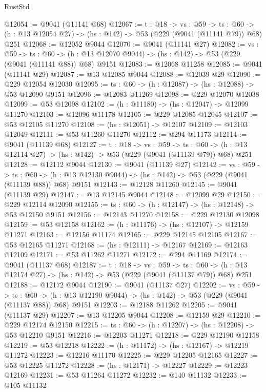 \begin{lexlean}{RustStd}
\begin{coremodule}
@12054 := @9041 (@11141 @68)
@12067 := {t : @18} ->
  {vs : @59} ->
  {ts : @60} -> (h : @13 @12054 @27) -> (hs : @142) -> @53 (@229 (@9041 (@11141 @79)) @68) @251
@12068 := @12052 @9044
@12070 := @9041 (@11141 @27)
@12082 := {vs : @59} ->
  {ts : @60} -> (h : @13 @12070 @9044) -> (hs : @142) -> @53 (@229 (@9041 (@11141 @88)) @68) @9151
@12083 := @12068 @11258
@12085 := @9041 (@11141 @29)
@12087 := @13 @12085 @9044
@12088 := @12039 @29
@12090 := @229 @12054 @12030
@12095 := {ts : @60} -> (h : @12087) -> (hs : @12088) -> @53 @12090 @9151
@12096 := @12083 @11269
@12098 := @229 @12070 @12038
@12099 := @53 @12098
@12102 := (h : @11180) -> (hs : @12047) -> @12099 @11270
@12103 := @12096 @11178
@12105 := @229 @12085 @12045
@12107 := @53 @12105 @11270
@12108 := (hs : @12051) -> @12107
@12109 := @12103 @12049
@12111 := @53 @11260 @11270
@12112 := @294 @11173
@12114 := @9041 (@11139 @68)
@12127 := {t : @18} ->
  {vs : @59} ->
  {ts : @60} -> (h : @13 @12114 @27) -> (hs : @142) -> @53 (@229 (@9041 (@11139 @79)) @68) @251
@12128 := @12112 @9044
@12130 := @9041 (@11139 @27)
@12142 := {vs : @59} ->
  {ts : @60} -> (h : @13 @12130 @9044) -> (hs : @142) -> @53 (@229 (@9041 (@11139 @88)) @68) @9151
@12143 := @12128 @11260
@12145 := @9041 (@11139 @29)
@12147 := @13 @12145 @9044
@12148 := @12099 @29
@12150 := @229 @12114 @12090
@12155 := {ts : @60} -> (h : @12147) -> (hs : @12148) -> @53 @12150 @9151
@12156 := @12143 @11270
@12158 := @229 @12130 @12098
@12159 := @53 @12158
@12162 := (h : @11176) -> (hs : @12107) -> @12159 @11271
@12163 := @12156 @11174
@12165 := @229 @12145 @12105
@12167 := @53 @12165 @11271
@12168 := (hs : @12111) -> @12167
@12169 := @12163 @12109
@12171 := @53 @11262 @11271
@12172 := @294 @11169
@12174 := @9041 (@11137 @68)
@12187 := {t : @18} ->
  {vs : @59} ->
  {ts : @60} -> (h : @13 @12174 @27) -> (hs : @142) -> @53 (@229 (@9041 (@11137 @79)) @68) @251
@12188 := @12172 @9044
@12190 := @9041 (@11137 @27)
@12202 := {vs : @59} ->
  {ts : @60} -> (h : @13 @12190 @9044) -> (hs : @142) -> @53 (@229 (@9041 (@11137 @88)) @68) @9151
@12203 := @12188 @11262
@12205 := @9041 (@11137 @29)
@12207 := @13 @12205 @9044
@12208 := @12159 @29
@12210 := @229 @12174 @12150
@12215 := {ts : @60} -> (h : @12207) -> (hs : @12208) -> @53 @12210 @9151
@12216 := @12203 @11271
@12218 := @229 @12190 @12158
@12219 := @53 @12218
@12222 := (h : @11172) -> (hs : @12167) -> @12219 @11272
@12223 := @12216 @11170
@12225 := @229 @12205 @12165
@12227 := @53 @12225 @11272
@12228 := (hs : @12171) -> @12227
@12229 := @12223 @12169
@12231 := @53 @11264 @11272
@12232 := @140 @11132
@12233 := @105 @11132

\end{coremodule}
\end{lexlean}
